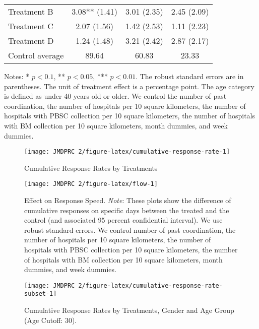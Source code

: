 \documentclass[12pt, a4paper]{article}
\begin{document}
\begin{table}[H]
\begin{threeparttable}
\begin{tabular}[t]{lccc}
\hspace{1em}Treatment B & 3.08** (1.41) & 3.01 (2.35) & 2.45 (2.09)\\
\hspace{1em}Treatment C & 2.07 (1.56) & 1.42 (2.53) & 1.11 (2.23)\\
\hspace{1em}Treatment D & 1.24 (1.48) & 3.21 (2.42) & 2.87 (2.17)\\
\hspace{1em}Control average & 89.64 & 60.83 & 23.33\\
\bottomrule
\end{tabular}
\begin{tablenotes}
\item Notes: * $p < 0.1$, ** $p < 0.05$, *** $p < 0.01$. The robust standard errors are in parentheses. The unit of treatment effect is a percentage point. The age category is defined as under 40 years old or older. We control the number of past coordination, the number of hospitals per 10 square kilometers, the number of hospitals with PBSC collection per 10 square kilometers, the number of hospitals with BM collection per 10 square kilometers, month dummies, and week dummies.
\end{tablenotes}
\end{threeparttable}
\end{table}

\begin{figure}[H]
\texttt{[image: JMDPRC~2/figure-latex/cumulative-response-rate-1]} \caption{Cumulative Response Rates by Treatments}\label{fig:cumulative-response-rate}
\end{figure}

\begin{figure}[H]
\texttt{[image: JMDPRC~2/figure-latex/flow-1]} \caption{Effect on Response Speed. \newline \emph{Note}: These plots show the difference of cumulative responses on specific days between the treated and the control (and associated 95 percent confidential interval). We use robust standard errors. We control number of past coordination, the number of hospitals per 10 square kilometers, the number of hospitals with PBSC collection per 10 square kilometers, the number of hospitals with BM collection per 10 square kilometers, month dummies, and week dummies.}\label{fig:flow}
\end{figure}

\begin{figure}[H]
\texttt{[image: JMDPRC~2/figure-latex/cumulative-response-rate-subset-1]} \caption{Cumulative Response Rates by Treatments, Gender and Age Group (Age Cutoff: 30).}\label{fig:cumulative-response-rate-subset}
\end{figure}
\end{document}
